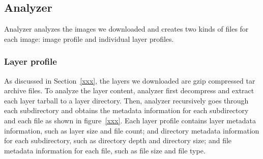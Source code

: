 %
%

\subsection{Analyzer}

Analyzer analyzes the images we downloaded and creates two kinds of files for each image: image profile and individual layer profiles.
%
%
\subsubsection{Layer profile}

As discussed in Section~\ref{xxx}, the layers we downloaded are gzip compressed tar archive files.
%
To analyze the layer content, analyzer first decompress and extract each layer tarball to a layer directory.
%
Then, analyzer recursively goes through each subdirectory and obtains the metadata information for each subdirectory and each file as shown in figure~\ref{xxx}. Each layer profile contains layer metadata information, such as layer size and file count; and directory metadata information for each subdirectory, such as directory depth and directory size; and file metadata information for each file, such as file size and file type.
%






